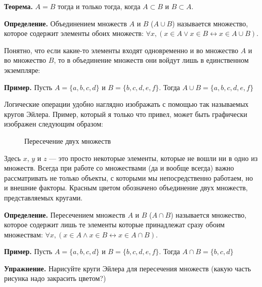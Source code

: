 {\bfseries Теорема.}  $A=B$ тогда и только тогда, когда $A\subset B$ и $B \subset A$.

{\bfseries Определение.} Объединением множеств $A$ и $B$ ($A\cup B$) называется множество, которое содержит элементы обоих множеств: $\forall x, (x\in A \vee x \in B \leftrightarrow x\in A\cup B)$.

Понятно, что если какие-то элементы входят одновременно и во множество $A$ и во множество $B$, то в объединение множеств они войдут лишь в единственном экземпляре:

{\bfseries Пример.} Пусть $A = \{a, b, c, d\}$ и $B = \{b, c, d, e, f\}$. Тогда $A\cup B = \{a, b, c, d, e, f\}$

Логические операции удобно наглядно изображать с помощью так называемых кругов Эйлера. Пример, который я только что привел, может быть графически изображен следующим образом:

\begin{figure}[h]
\centering
\def\seta{(-1,0) circle (2)}
\def\setb{(1,0) circle (2)}
\caption{Пересечение двух множеств}
\end{figure}


Здесь $x$, $y$ и $z$ — это просто некоторые элементы, которые не вошли ни в одно из множеств. Всегда при работе со множествами (да и вообще всегда) важно рассматривать не только объекты, с которыми мы непосредственно работаем, но и внешние факторы. Красным цветом обозначено объединение двух множеств, представляемых кругами.

{\bfseries Определение.} Пересечением множеств $A$ и $B$ ($A\cap B$) называется множество, которое содержит лишь те элементы которые принадлежат сразу обоим множествам: $\forall x, (x\in A \wedge x \in B \leftrightarrow x\in A\cap B)$.

{\bfseries Пример.} Пусть $A = \{a, b, c, d\}$ и $B = \{b, c, d, e, f\}$. Тогда $A\cap B = \{b, c, d\}$

{\bfseries Упражнение.} Нарисуйте круги Эйлера для пересечения множеств (какую часть рисунка надо закрасить цветом?)

